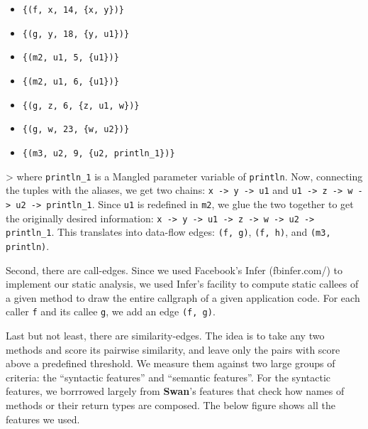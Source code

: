 \documentclass[sigconf,review,anonymous]{acmart}\settopmatter{printfolios=true,printccs=false,printacmref=false}
\begin{document}
\begin{itemize}
\item \texttt{\{(f, x, 14, \{x, y\})\}}
\item \texttt{\{(g, y, 18, \{y, u1\})\}}
\item \texttt{\{(m2, u1, 5, \{u1\})\}}
\item \texttt{\{(m2, u1, 6, \{u1\})\}}
\item \texttt{\{(g, z, 6, \{z, u1, w\})\}}
\item \texttt{\{(g, w, 23, \{w, u2\})\}}
\item \texttt{\{(m3, u2, 9, \{u2, println\_1\})\}}
\end{itemize}

>
where \texttt{println\_1} is a Mangled parameter variable of \texttt{println}.
Now, connecting the tuples with the aliases, we get two chains:
\texttt{x -> y -> u1} and \texttt{u1 -> z -> w -> u2 -> println\_1}. Since \texttt{u1} is
redefined in \texttt{m2}, we glue the two together to get the originally desired
information: \texttt{x -> y -> u1 -> z -> w -> u2 -> println\_1}. This translates
into data-flow edges: \texttt{(f, g)}, \texttt{(f, h)}, and \texttt{(m3, println)}.



Second, there are call-edges. Since we used Facebook's Infer (fbinfer.com/) to
implement our static analysis, we used Infer's facility to compute static
callees of a given method to draw the entire callgraph of a given application
code. For each caller \texttt{f} and its callee \texttt{g}, we add an edge
\texttt{(f, g)}.


Last but not least, there are similarity-edges. The idea is to take any two
methods and score its pairwise similarity, and leave only the pairs with score
above a predefined threshold. We measure them against two large groups of
criteria: the ``syntactic features'' and ``semantic features''. For the
syntactic features, we borrrowed largely from \textbf{Swan}'s features that
check how names of methods or their return types are composed. The below
figure %
shows all the features we used.
\end{document}
